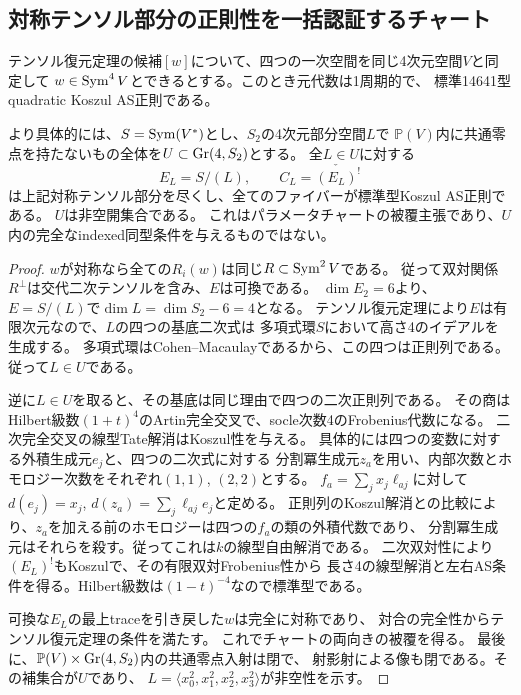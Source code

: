 \subsection{対称テンソル部分の正則性を一括認証するチャート}
\begin{theorem}[対称Frobeniusチャート]\label{thm:symmetric-frobenius-chart}
テンソル復元定理の候補$[w]$について、四つの一次空間を同じ4次元空間$V$と同定して
$w\in\operatorname{Sym}^4 V$とできるとする。このとき元代数は1周期的で、
標準14641型quadratic Koszul AS正則である。

より具体的には、$S=\operatorname{Sym}(V^*)$とし、$S_2$の4次元部分空間$L$で
$\mathbb P(V)$内に共通零点を持たないもの全体を$U\subset\operatorname{Gr}(4,S_2)$とする。
全$L\in U$に対する
\[
 E_L=S/(L),\qquad C_L=\check{(E_L)^!}
\]
は上記対称テンソル部分を尽くし、全てのファイバーが標準型Koszul AS正則である。
$U$は非空開集合である。
これはパラメータチャートの被覆主張であり、$U$内の完全なindexed同型条件を与えるものではない。
\end{theorem}
\begin{proof}
$w$が対称なら全ての$R_i(w)$は同じ$R\subset\operatorname{Sym}^2 V$である。
従って双対関係$R^\perp$は交代二次テンソルを含み、$E$は可換である。
$\dim E_2=6$より、$E=S/(L)$で$\dim L=\dim S_2-6=4$となる。
テンソル復元定理により$E$は有限次元なので、$L$の四つの基底二次式は
多項式環$S$において高さ4のイデアルを生成する。
多項式環はCohen--Macaulayであるから、この四つは正則列である。
従って$L\in U$である。

逆に$L\in U$を取ると、その基底は同じ理由で四つの二次正則列である。
その商はHilbert級数$(1+t)^4$のArtin完全交叉で、socle次数4のFrobenius代数になる。
二次完全交叉の線型Tate解消はKoszul性を与える。
具体的には四つの変数に対する外積生成元$e_j$と、四つの二次式に対する
分割冪生成元$z_a$を用い、内部次数とホモロジー次数をそれぞれ$(1,1)$, $(2,2)$とする。
$f_a=\sum_j x_j\ell_{aj}$に対して
$d(e_j)=x_j$, $d(z_a)=\sum_j\ell_{aj}e_j$と定める。
正則列のKoszul解消との比較により、$z_a$を加える前のホモロジーは四つの$f_a$の類の外積代数であり、
分割冪生成元はそれらを殺す。従ってこれは$k$の線型自由解消である。
二次双対性により$(E_L)^!$もKoszulで、その有限双対Frobenius性から
長さ4の線型解消と左右AS条件を得る。Hilbert級数は$(1-t)^{-4}$なので標準型である。

可換な$E_L$の最上traceを引き戻した$w$は完全に対称であり、
対合の完全性からテンソル復元定理の条件を満たす。
これでチャートの両向きの被覆を得る。
最後に、$\mathbb P(V)\times\operatorname{Gr}(4,S_2)$内の共通零点入射は閉で、
射影射による像も閉である。その補集合が$U$であり、
$L=\langle x_0^2,x_1^2,x_2^2,x_3^2\rangle$が非空性を示す。
\end{proof}
